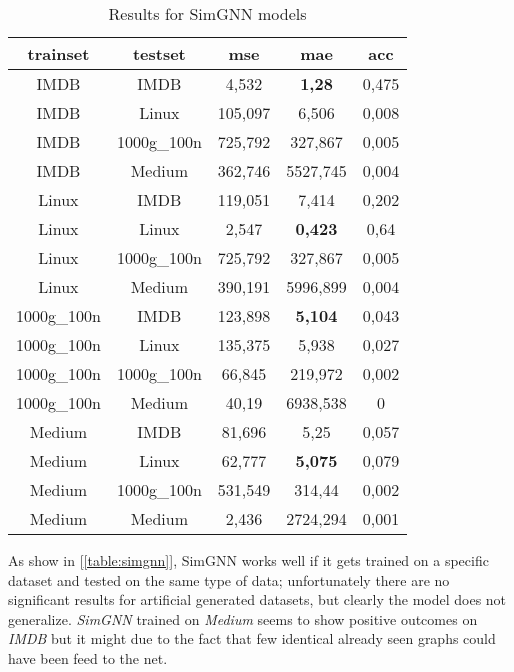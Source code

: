 \documentclass[../Thesis.tex]{subfiles}
\begin{document}
	\begin{table}[H]
		\centering
		\setlength\tabcolsep{4pt}
		\renewcommand{\arraystretch}{1.2}
		\begin{tabular}{c|c|c|c|c}
			\toprule
			\textbf{trainset} & \textbf{testset} & \textbf{mse} & \textbf{mae} & \textbf{acc} \\
			\midrule
IMDB & IMDB & 4,532 & \textbf{1,28} & 0,475 \\
IMDB & Linux & 105,097 & 6,506 & 0,008 \\
IMDB & 1000g\_100n & 725,792 & 327,867 & 0,005 \\
IMDB & Medium & 362,746 & 5527,745 & 0,004 \\ \midrule
Linux & IMDB & 119,051 & 7,414 & 0,202 \\
Linux & Linux & 2,547 & \textbf{0,423} & 0,64 \\
Linux & 1000g\_100n & 725,792 & 327,867 & 0,005 \\
Linux & Medium & 390,191 & 5996,899 & 0,004 \\ \midrule
1000g\_100n & IMDB & 123,898 & \textbf{5,104} & 0,043 \\
1000g\_100n & Linux & 135,375 & 5,938 & 0,027 \\
1000g\_100n & 1000g\_100n & 66,845 & 219,972 & 0,002 \\
1000g\_100n & Medium & 40,19 & 6938,538 & 0 \\ \midrule
Medium & IMDB & 81,696 & 5,25 & 0,057 \\
Medium & Linux & 62,777 & \textbf{5,075} & 0,079 \\
Medium & 1000g\_100n & 531,549 & 314,44 & 0,002 \\
Medium & Medium & 2,436 & 2724,294 & 0,001 \\
			\bottomrule
		\end{tabular}
		\caption{Results for SimGNN models}
		\label{table:simgnn}
	\end{table}
	
	As show in [\autoref{table:simgnn}], SimGNN works well if it gets trained on a specific dataset and tested on the same type of data; unfortunately there are no significant results for artificial generated datasets, but clearly the model does not generalize. \emph{SimGNN} trained on \emph{Medium} seems to show positive outcomes on \emph{IMDB} but it might due to the fact that few identical already seen graphs could have been feed to the net.
	
\end{document}
